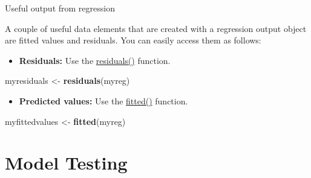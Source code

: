 \documentclass[ignorenonframetext,]{beamer}
\newenvironment{Shaded}{\begin{snugshade}}{\end{snugshade}}
\newcommand{\KeywordTok}[1]{\textcolor[rgb]{0.26,0.66,0.93}{\textbf{#1}}}
\newcommand{\StringTok}[1]{\textcolor[rgb]{0.02,0.61,0.04}{#1}}
\newcommand{\NormalTok}[1]{\textcolor[rgb]{0.74,0.68,0.62}{#1}}
\providecommand{\tightlist}{%
  \setlength{\itemsep}{0pt}\setlength{\parskip}{0pt}}
\begin{document}
\begin{frame}[fragile]{Useful output from regression}

A couple of useful data elements that are created with a regression
output object are fitted values and residuals. You can easily access
them as follows:

\begin{itemize}
\tightlist
\item
  \textbf{Residuals:} Use the
  \href{https://www.rdocumentation.org/packages/stats/versions/3.4.3/topics/residuals}{residuals()}
  function.
\end{itemize}

\begin{Shaded}
\begin{Highlighting}[]
\NormalTok{myresiduals <-}\StringTok{ }\KeywordTok{residuals}\NormalTok{(myreg)}
\end{Highlighting}
\end{Shaded}

\begin{itemize}
\tightlist
\item
  \textbf{Predicted values:} Use the
  \href{https://www.rdocumentation.org/packages/stats/versions/3.4.3/topics/fitted}{fitted()}
  function.
\end{itemize}

\begin{Shaded}
\begin{Highlighting}[]
\NormalTok{myfittedvalues <-}\StringTok{ }\KeywordTok{fitted}\NormalTok{(myreg)}
\end{Highlighting}
\end{Shaded}

\end{frame}

\section{Model Testing}\label{model-testing}
\end{document}
